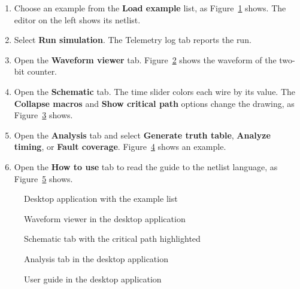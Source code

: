 \begin{enumerate}
\item Choose an example from the \textbf{Load example} list, as Figure~\ref{fig:desktophome} shows. The editor on the left shows its netlist.
\item Select \textbf{Run simulation}. The Telemetry log tab reports the run.
\item Open the \textbf{Waveform viewer} tab. Figure~\ref{fig:desktopwave} shows the waveform of the two-bit counter.
\item Open the \textbf{Schematic} tab. The time slider colors each wire by its value. The \textbf{Collapse macros} and \textbf{Show critical path} options change the drawing, as Figure~\ref{fig:desktopschematic} shows.
\item Open the \textbf{Analysis} tab and select \textbf{Generate truth table}, \textbf{Analyze timing}, or \textbf{Fault coverage}. Figure~\ref{fig:desktopanalysis} shows an example.
\item Open the \textbf{How to use} tab to read the guide to the netlist language, as Figure~\ref{fig:desktopguide} shows.
\end{enumerate}

\begin{figure}[H]
\centering
{}
\caption{Desktop application with the example list}
\label{fig:desktophome}
\end{figure}

\begin{figure}[H]
\centering
{}
\caption{Waveform viewer in the desktop application}
\label{fig:desktopwave}
\end{figure}

\begin{figure}[H]
\centering
{}
\caption{Schematic tab with the critical path highlighted}
\label{fig:desktopschematic}
\end{figure}

\begin{figure}[H]
\centering
{}
\caption{Analysis tab in the desktop application}
\label{fig:desktopanalysis}
\end{figure}

\begin{figure}[H]
\centering
{}
\caption{User guide in the desktop application}
\label{fig:desktopguide}
\end{figure}

